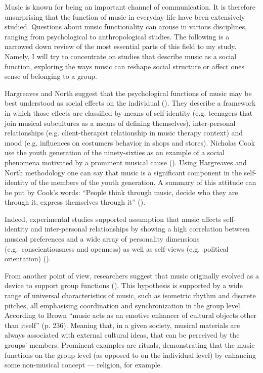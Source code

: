 \documentclass[a4paper,11pt]{article}
\begin{document}
Music is known for being an important channel of communication.
It is therefore unsurprising that the function of music in everyday life have been extensively studied.
Questions about music functionality can arouse in various disciplines, ranging from psychological to anthropological studies.
The following is a narrowed down review of the most essential parts of this field to my study.
Namely, I will try to concentrate on studies that describe music as a social function, exploring the ways music can reshape social structure or affect ones sense of belonging to a group.

Hargreaves and North suggest that the psychological functions of music may be best understood as social effects on the individual (\cite*{hargreaves99}).
They describe a framework in which those effects are classified by means of self-identity (e.g. teenagers that join musical subcultures as a means of defining themselves), inter-personal relationships (e.g. client-therapist relationship in music therapy context) and mood (e.g. influences on costumers behavior in shops and stores).
Nicholas Cook use the youth generation of the ninety-sixties as an example of a social phenomena motivated by a prominent musical cause (\cite*[p. 5]{cook00}).
Using Hargreaves and North methodology one can say that music is a significant component in the self-identity of the members of the youth generation.
A summary of this attitude can be put by Cook's words: ``People think through music, decide who they are through it, express themselves through it'' (\cite*{cook00}).

Indeed, experimental studies supported assumption that music affects self-identity and inter-personal relationships by showing a high correlation between musical preferences and a wide array of personality dimensions (e.g.\ conscientiousness and openness) as well as self-views (e.g.\ political orientation) (\cite{rentfrow03}).

From another point of view, researchers suggest that music originally evolved as a device to support group functions (\cite{Brown2000}).
This hypothesis is supported by a wide range of universal characteristics of music, such as isometric rhythm and discrete pitches, all emphasising coordination and synchronization in the group level.
According to Brown ``music acts as an emotive enhancer of cultural objects other than itself'' (p. 236).
Meaning that, in a given society, musical materials are always associated with external cultural ideas, that can be perceived by the groups' members.
Prominent examples are rituals, demonstrating that the music functions on the group level (as opposed to on the individual level) by enhancing some non-musical concept ---  religion, for example.
\end{document}
